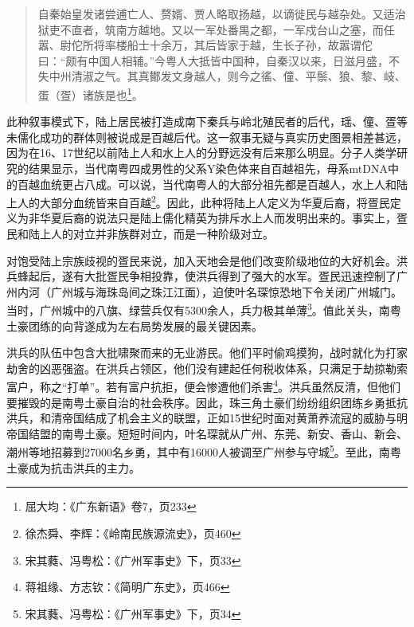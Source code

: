 \begin{quote}

自秦始皇发诸尝逋亡人、赘婿、贾人略取扬越，以谪徙民与越杂处。又适治狱吏不直者，筑南方越地。又以一军处番禺之都，一军戍台山之塞，而任嚣、尉佗所将率楼船士十余万，其后皆家于越，生长子孙，故嚣谓佗曰：“颇有中国人相辅。”今粤人大抵皆中国种，自秦汉以来，日滋月盛，不失中州清淑之气。其真鄼发文身越人，则今之徭、僮、平鬃、狼、黎、岐、蛋（疍）诸族是也\footnote{屈大均：《广东新语》卷7，页233}。

\end{quote}

此种叙事模式下，陆上居民被打造成南下秦兵与岭北殖民者的后代，瑶、僮、疍等未儒化成功的群体则被说成是百越后代。这一叙事无疑与真实历史图景相差甚远，因为在16、17世纪以前陆上人和水上人的分野远没有后来那么明显。分子人类学研究的结果显示，当代南粤四成男性的父系Y染色体来自百越祖先，母系mtDNA中的百越血统更占八成。可以说，当代南粤人的大部分祖先都是百越人，水上人和陆上人的大部分血统皆来自百越\footnote{徐杰舜、李辉：《岭南民族源流史》，页460}。因此，此种将陆上人定义为华夏后裔，将疍民定义为非华夏后裔的说法只是陆上儒化精英为排斥水上人而发明出来的。事实上，疍民和陆上人的对立并非族群对立，而是一种阶级对立。

对饱受陆上宗族歧视的疍民来说，加入天地会是他们改变阶级地位的大好机会。洪兵蜂起后，遂有大批疍民争相投靠，使洪兵得到了强大的水军。疍民迅速控制了广州内河（广州城与海珠岛间之珠江江面），迫使叶名琛惊恐地下令关闭广州城门。当时，广州城中的八旗、绿营兵仅有5300余人，兵力极其单薄\footnote{宋其蕤、冯粤松：《广州军事史》下，页33}。值此关头，南粤土豪团练的向背遂成为左右局势发展的最关键因素。

洪兵的队伍中包含大批啸聚而来的无业游民。他们平时偷鸡摸狗，战时就化为打家劫舍的凶恶强盗。在洪兵占领区，他们没有建起任何税收体系，只满足于劫掠勒索富户，称之“打单”。若有富户抗拒，便会惨遭他们杀害\footnote{蒋祖缘、方志钦：《简明广东史》，页466}。洪兵虽然反清，但他们要摧毁的是南粤土豪自治的社会秩序。因此，珠三角土豪们纷纷组织团练乡勇抵抗洪兵，和清帝国结成了机会主义的联盟，正如15世纪时面对黄萧养流寇的威胁与明帝国结盟的南粤土豪。短短时间内，叶名琛就从广州、东莞、新安、香山、新会、潮州等地招募到27000名乡勇，其中有16000人被调至广州参与守城\footnote{宋其蕤、冯粤松：《广州军事史》下，页34}。至此，南粤土豪成为抗击洪兵的主力。

